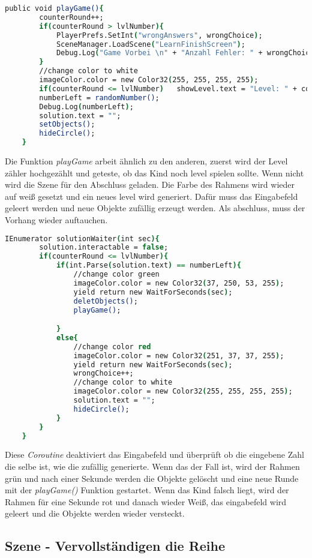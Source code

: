 \begin{lstlisting}[language=csh, caption={hideCircle.cs playGame-Funktion}]
	public void playGame(){
		counterRound++;
		if(counterRound > lvlNumber){
			PlayerPrefs.SetInt("wrongAnswers", wrongChoice);
			SceneManager.LoadScene("LearnFinishScreen");
			Debug.Log("Game Vorbei \n" + "Anzahl Fehler: " + wrongChoice);
		}
		//change color to white
		imageColor.color = new Color32(255, 255, 255, 255);
		if(counterRound <= lvlNumber)	showLevel.text = "Level: " + counterRound + "/" + lvlNumber;
		numberLeft = randomNumber();
		Debug.Log(numberLeft);
		solution.text = "";
		setObjects();
		hideCircle();
	}
\end{lstlisting}
Die Funktion \textit{playGame} arbeit ähnlich zu den anderen, zuerst wird der Level zähler hochgezählt und geteste, ob das Kind noch level spielen sollte. Wenn nicht wird die Szene für den Abschluss geladen. Die Farbe des Rahmens wird wieder auf weiß gesetzt und ein neues level wird generiert. Dafür muss das Eingabefeld geleert werden und neue Objekte zufällig erzeugt werden. Als abschluss, muss der Vorhang wieder auftauchen.\\
\begin{lstlisting}[language=csh, caption={hideCircle.cs solutionWaiter-Funktion}]
	IEnumerator solutionWaiter(int sec){
		solution.interactable = false;
		if(counterRound <= lvlNumber){
			if(int.Parse(solution.text) == numberLeft){
				//change color green
				imageColor.color = new Color32(37, 250, 53, 255);
				yield return new WaitForSeconds(sec);
				deletObjects();
				playGame();

			}
			else{
				//change color red
				imageColor.color = new Color32(251, 37, 37, 255);
				yield return new WaitForSeconds(sec);
				wrongChoice++;
				//change color to white
				imageColor.color = new Color32(255, 255, 255, 255);
				solution.text = "";
				hideCircle();
			}
		}
	}
\end{lstlisting}
Diese \textit{Coroutine} deaktiviert das Eingabefeld und überprüft ob die eingebene Zahl die selbe ist, wie die zufällig generierte. Wenn das der Fall ist, wird der Rahmen grün und nach einer Sekunde werden die Objekte gelöscht und eine neue Runde mit der \textit{playGame()} Funktion gestartet. Wenn das Kind falsch liegt, wird der Rahmen für eine Sekunde rot und danach wieder Weiß, das eingabefeld wird geleert und die Objekte werden wieder versteckt.
\subsection{Szene - Vervollständigen die Reihe}
